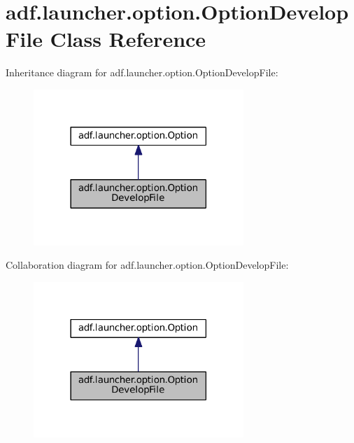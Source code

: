 \hypertarget{classadf_1_1launcher_1_1option_1_1OptionDevelopFile}{}\section{adf.\+launcher.\+option.\+Option\+Develop\+File Class Reference}
\label{classadf_1_1launcher_1_1option_1_1OptionDevelopFile}


Inheritance diagram for adf.\+launcher.\+option.\+Option\+Develop\+File\+:
\nopagebreak
\begin{figure}[H]
\begin{center}
\leavevmode
\includegraphics[width=225pt]{classadf_1_1launcher_1_1option_1_1OptionDevelopFile__inherit__graph}
\end{center}
\end{figure}


Collaboration diagram for adf.\+launcher.\+option.\+Option\+Develop\+File\+:
\nopagebreak
\begin{figure}[H]
\begin{center}
\leavevmode
\includegraphics[width=225pt]{classadf_1_1launcher_1_1option_1_1OptionDevelopFile__coll__graph}
\end{center}
\end{figure}
